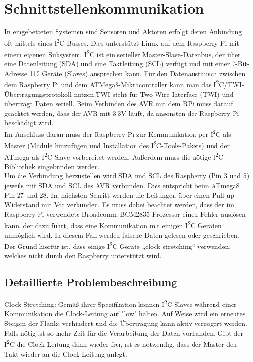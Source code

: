 
\chapter{Schnittstellenkommunikation}
In eingebetteten Systemen sind Sensoren und Aktoren erfolgt deren Anbindung oft mittels eines I\textsuperscript{2}C-Busses. Dies unterstützt Linux auf dem Raspberry Pi mit einem eigenen Subsystem. I\textsuperscript{2}C ist ein serieller Master-Slave-Datenbus, der über eine Datenleitung (SDA) und eine Taktleitung (SCL) verfügt und mit einer 7-Bit-Adresse 112 Geräte (Slaves) ansprechen kann. Für den Datenaustausch zwischen dem Raspberry Pi und dem ATMega8-Mikrocontroller kann man das I\textsuperscript{2}C/TWI-Übertragungsprotokoll nutzen.TWI steht für Two-Wire-Interface (TWI) und überträgt Daten seriell.
Beim Verbinden des AVR mit dem RPi muss darauf geachtet werden, dass der AVR mit 3,3V läuft, da ansonsten der Raspberry Pi beschädigt wird.\\
Im Anschluss daran muss der Raspberry Pi zur Kommunikation per I\textsuperscript{2}C als Master (Module hinzufügen und Installation des I\textsuperscript{2}C-Tools-Pakets) und der ATmega als I\textsuperscript{2}C-Slave vorbereitet werden. Außerdem muss die nötige I\textsuperscript{2}C-Bibliothek eingebunden werden.\\
Um die Verbindung herzustellen wird SDA und SCL des Raspberry (Pin 3 und 5) jeweils mit SDA und SCL des AVR verbunden. Dies entspricht beim ATmega8 Pin 27 und 28. Im nächsten Schritt werden die Leitungen über einen Pull-up-Widerstand mit Vcc verbunden.
Es muss dabei beachtet werden, dass der im Raspberry Pi verwendete Broadcomm BCM2835 Prozessor einen Fehler auslösen kann, der dazu führt, dass eine Kommunikation mit einigen I\textsuperscript{2}C Geräten unmöglich wird. In diesem Fall werden falsche Daten gelesen oder geschrieben. Der Grund hierfür ist, dass einige I\textsuperscript{2}C Geräte „clock stretching“ verwenden, welches nicht durch den Raspberry unterstützt wird. 

\section{Detaillierte Problembeschreibung} \label{clockstretching}
Clock Stretching: Gemäß ihrer Spezifikation können I\textsuperscript{2}C-Slaves während einer Kommunikation die Clock-Leitung auf "low" halten. Auf Weise wird ein erneutes Steigen der Flanke verhindert und die Übertragung kann aktiv verzögert werden. Falls nötig ist so mehr Zeit für die Verarbeitung der Daten vorhanden. Gibt der I\textsuperscript{2}C die Clock Leitung dann wieder frei, ist es notwendig, dass der Master den Takt wieder an die Clock-Leitung anlegt.

